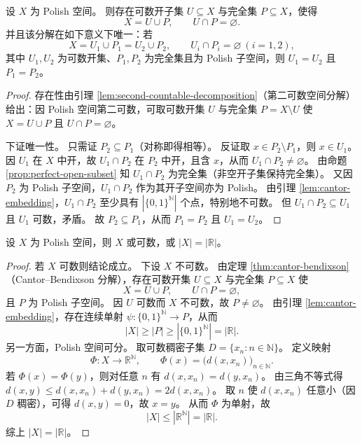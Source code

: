 \documentclass[lang=cn,a4paper,newtx,figureplace=section,tableplace=section]{elegantbook}
\begin{document}
\begin{theorem}\label{thm:cantor-bendixson}
  设 $X$ 为 Polish 空间。
  则存在可数开子集 $U\subseteq X$ 与完全集 $P\subseteq X$，使得
  \[
    X=U\cup P,\qquad U\cap P=\varnothing.
  \]
  并且该分解在如下意义下唯一：若
  \[
    X=U_1\cup P_1=U_2\cup P_2,\qquad U_i\cap P_i=\varnothing\ (i=1,2),
  \]
  其中 $U_1,U_2$ 为可数开集、$P_1,P_2$ 为完全集且为 Polish 子空间，则 $U_1=U_2$ 且 $P_1=P_2$。
\end{theorem}
\begin{proof}
  存在性由引理 \ref{lem:second-countable-decomposition}（第二可数空间分解）给出：因 Polish 空间第二可数，可取可数开集 $U$ 与完全集 $P=X\setminus U$ 使 $X=U\cup P$ 且 $U\cap P=\varnothing$。

  下证唯一性。
  只需证 $P_2\subseteq P_1$（对称即得相等）。
  反证取 $x\in P_2\setminus P_1$，则 $x\in U_1$。
  因 $U_1$ 在 $X$ 中开，故 $U_1\cap P_2$ 在 $P_2$ 中开，且含 $x$，从而 $U_1\cap P_2\ne\varnothing$。
  由命题 \ref{prop:perfect-open-subset} 知 $U_1\cap P_2$ 为完全集（非空开子集保持完全集）。
  又因 $P_2$ 为 Polish 子空间，$U_1\cap P_2$ 作为其开子空间亦为 Polish。
  由引理 \ref{lem:cantor-embedding}，$U_1\cap P_2$ 至少具有 $|\{0,1\}^{\mathbb{N}}|$ 个点，特别地不可数。
  但 $U_1\cap P_2\subseteq U_1$ 且 $U_1$ 可数，矛盾。
  故 $P_2\subseteq P_1$，从而 $P_1=P_2$ 且 $U_1=U_2$。
\end{proof}

\begin{theorem}\label{thm:polish-cardinality}
  设 $X$ 为 Polish 空间，则 $X$ 或可数，或 $|X|=|\mathbb{R}|$。
\end{theorem}
\begin{proof}
  若 $X$ 可数则结论成立。
  下设 $X$ 不可数。
  由定理 \ref{thm:cantor-bendixson}（Cantor--Bendixson 分解），存在可数开集 $U\subseteq X$ 与完全集 $P\subseteq X$ 使
  \[
    X=U\cup P,\qquad U\cap P=\varnothing,
  \]
  且 $P$ 为 Polish 子空间。
  因 $U$ 可数而 $X$ 不可数，故 $P\ne\varnothing$。
  由引理 \ref{lem:cantor-embedding}，存在连续单射 $\psi:\{0,1\}^{\mathbb{N}}\to P$，从而
  \[
    |X|\ge |P|\ge |\{0,1\}^{\mathbb{N}}|=|\mathbb{R}|.
  \]
  另一方面，Polish 空间可分。
  取可数稠密子集 $D=\{x_n:n\in\mathbb{N}\}$。
  定义映射
  \[
    \Phi:X\to\mathbb{R}^{\mathbb{N}},\qquad \Phi(x)=\bigl(d(x,x_n)\bigr)_{n\in\mathbb{N}}.
  \]
  若 $\Phi(x)=\Phi(y)$，则对任意 $n$ 有 $d(x,x_n)=d(y,x_n)$。
  由三角不等式得 $d(x,y)\le d(x,x_n)+d(y,x_n)=2d(x,x_n)$。
  取 $n$ 使 $d(x,x_n)$ 任意小（因 $D$ 稠密），可得 $d(x,y)=0$，故 $x=y$。
  从而 $\Phi$ 为单射，故
  \[
    |X|\le |\mathbb{R}^{\mathbb{N}}|=|\mathbb{R}|.
  \]
  综上 $|X|=|\mathbb{R}|$。
\end{proof}
\end{document}
